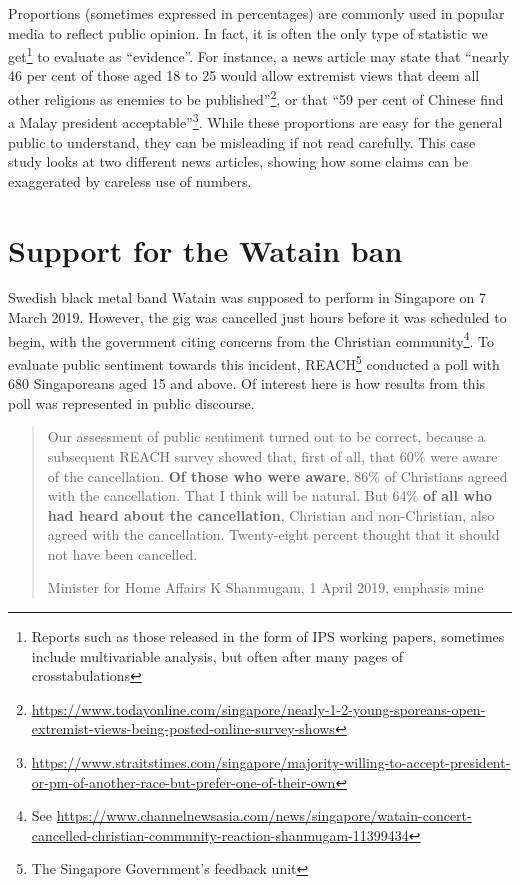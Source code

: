 \documentclass[
  openany]{book}
\begin{document}
Proportions (sometimes expressed in percentages) are commonly used in popular media to reflect public opinion. In fact, it is often the only type of statistic we get\footnote{Reports such as those released in the form of IPS working papers, sometimes include multivariable analysis, but often after many pages of crosstabulations} to evaluate as ``evidence''. For instance, a news article may state that ``nearly 46 per cent of those aged 18 to 25 would allow extremist views that deem all other religions as enemies to be published''\footnote{\url{https://www.todayonline.com/singapore/nearly-1-2-young-sporeans-open-extremist-views-being-posted-online-survey-shows}}, or that ``59 per cent of Chinese find a Malay president acceptable''\footnote{\url{https://www.straitstimes.com/singapore/majority-willing-to-accept-president-or-pm-of-another-race-but-prefer-one-of-their-own}}. While these proportions are easy for the general public to understand, they can be misleading if not read carefully. This case study looks at two different news articles, showing how some claims can be exaggerated by careless use of numbers.

\hypertarget{watain}{%
\section{Support for the Watain ban}\label{watain}}

Swedish black metal band Watain was supposed to perform in Singapore on 7 March 2019. However, the gig was cancelled just hours before it was scheduled to begin, with the government citing concerns from the Christian community\footnote{See \url{https://www.channelnewsasia.com/news/singapore/watain-concert-cancelled-christian-community-reaction-shanmugam-11399434}}. To evaluate public sentiment towards this incident, REACH\footnote{The Singapore Government's feedback unit} conducted a poll with 680 Singaporeans aged 15 and above. Of interest here is how results from this poll was represented in public discourse.

\begin{quote}
Our assessment of public sentiment turned out to be correct, because a subsequent REACH survey showed that, first of all, that 60\% were aware of the cancellation. \textbf{Of those who were aware}, 86\% of Christians agreed with the cancellation. That I think will be natural. But 64\% \textbf{of all who had heard about the cancellation}, Christian and non-Christian, also agreed with the cancellation. Twenty-eight percent thought that it should not have been cancelled.

Minister for Home Affairs K Shanmugam, 1 April 2019, emphasis mine
\end{quote}
\end{document}
